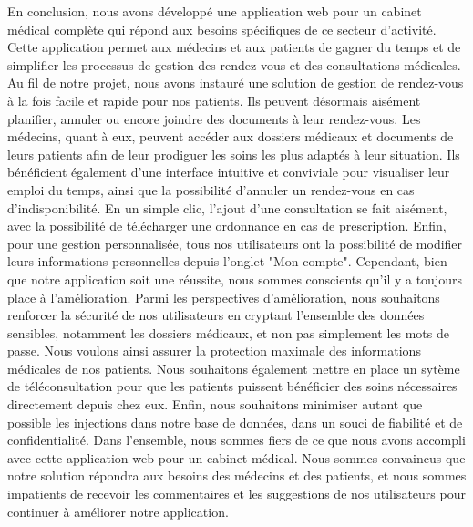 \documentclass[a4paper]{report}
\begin{document}
En conclusion, nous avons développé une application web pour un cabinet médical complète qui répond aux besoins spécifiques de ce secteur d'activité. Cette application permet aux 
médecins et aux patients de gagner du temps et de simplifier les processus de gestion des rendez-vous et des consultations 
médicales. \newline\newline
Au fil de notre projet, nous avons instauré une solution de gestion de rendez-vous à la fois facile et rapide pour nos patients. 
Ils peuvent désormais aisément planifier, annuler ou encore joindre des documents à leur rendez-vous. Les médecins, quant à eux, 
peuvent accéder aux dossiers médicaux et documents de leurs patients afin de leur prodiguer les soins les plus adaptés à leur situation. 
Ils bénéficient également d'une interface intuitive et conviviale pour visualiser leur emploi du temps, ainsi que la possibilité d'annuler un 
rendez-vous en cas d'indisponibilité. En un simple clic, l'ajout d'une consultation se fait aisément, avec la possibilité de télécharger une ordonnance 
en cas de prescription. Enfin, pour une gestion personnalisée, tous nos utilisateurs ont la possibilité de modifier leurs informations personnelles depuis 
l'onglet "Mon compte".\newline\newline
Cependant, bien que notre application soit une réussite, nous sommes conscients qu'il y a toujours place à l'amélioration. 
Parmi les perspectives d'amélioration, nous souhaitons renforcer la sécurité de nos utilisateurs en cryptant l'ensemble des données 
sensibles, notamment les dossiers médicaux, et non pas simplement les mots de passe. Nous voulons ainsi assurer la protection maximale 
des informations médicales de nos patients. 
Nous souhaitons également mettre en place un sytème de téléconsultation pour que les patients puissent bénéficier 
des soins nécessaires directement depuis chez eux. Enfin, nous souhaitons minimiser autant que possible les injections dans notre base de données, 
dans un souci de fiabilité et de confidentialité. \newline\newline
Dans l'ensemble, nous sommes fiers de ce que nous avons accompli avec cette application web pour un cabinet médical. Nous sommes 
convaincus que notre solution répondra aux besoins des médecins et des patients, et nous sommes impatients de recevoir les commentaires 
et les suggestions de nos utilisateurs pour continuer à améliorer notre application.



\end{document}
